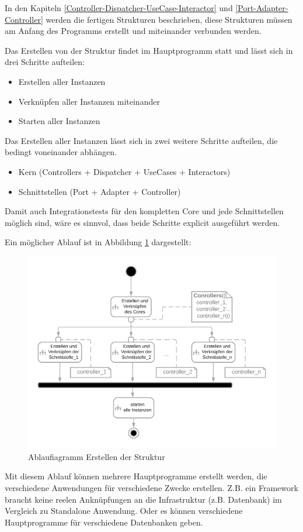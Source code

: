 In den Kapiteln \ref{Controller-Dispatcher-UseCase-Interactor} und \ref{Port-Adapter-Controller} 
werden die fertigen Strukturen beschrieben, diese Strukturen müssen am Anfang des Programms erstellt
und miteinander verbunden werden.

Das Erstellen von der Struktur findet im Hauptprogramm statt und lässt sich in drei Schritte aufteilen:
\begin{itemize}
    \item Erstellen aller Instanzen
    \item Verknüpfen aller Instanzen miteinander
    \item Starten aller Instanzen
\end{itemize}

Das Erstellen aller Instanzen lässt sich in zwei weitere Schritte aufteilen, die bedingt voneinander abhängen.
\begin{itemize}
    \item Kern (Controllers + Dispatcher + UseCases + Interactors)
    \item Schnittstellen (Port + Adapter + Controller)
\end{itemize}

Damit auch Integrationstests für den kompletten Core und jede Schnittstellen möglich sind, wäre es sinnvol, dass beide Schritte
explicit ausgeführt werden.

Ein möglicher Ablauf ist in Abbildung \ref{fig:ADCreate} dargestellt:
\begin{figure}[H]
    \centering
    \includegraphics[width=12cm]{./images/Erstellen AD.png}
     \caption[Ablaufiagramm Erstellen der Struktur]{Ablaufiagramm Erstellen der Struktur}
     \label{fig:ADCreate}
\end{figure}

Mit diesem Ablauf können mehrere Hauptprogramme erstellt werden, die verschiedene Anwendungen für verschiedene Zwecke erstellen.
Z.B. ein Framework braucht keine reelen Anknüpfungen an die Infrastruktur (z.B. Datenbank) im Vergleich zu Standalone Anwendung.
Oder es können verschiedene Hauptprogramme für verschiedene Datenbanken geben.
